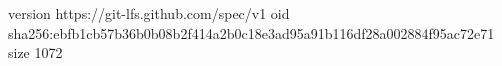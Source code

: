 version https://git-lfs.github.com/spec/v1
oid sha256:ebfb1cb57b36b0b08b2f414a2b0c18e3ad95a91b116df28a002884f95ac72e71
size 1072

